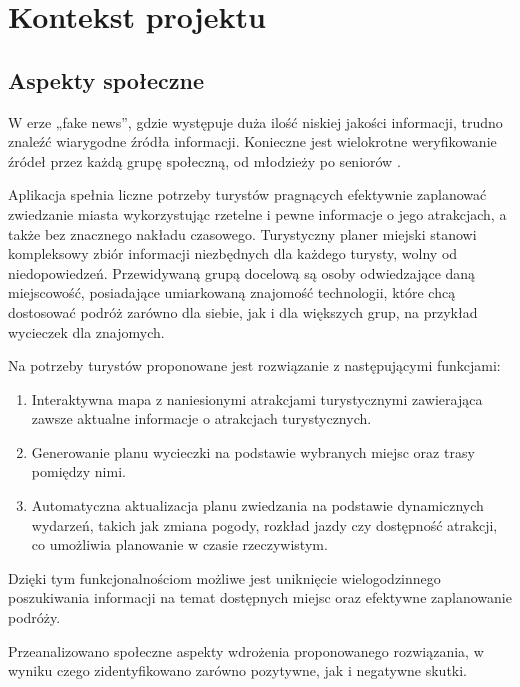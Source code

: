 
\chapter{Kontekst projektu}
\label{ch:kontekst-projektu}

\section{Aspekty społeczne}
\label{sec:aspekty-spoleczne}

W erze „fake news”, gdzie występuje duża ilość niskiej jakości informacji, trudno znaleźć wiarygodne źródła informacji.
Konieczne jest wielokrotne weryfikowanie źródeł przez każdą grupę społeczną, od młodzieży po seniorów \cite{fakenews}.

\indent Aplikacja spełnia liczne potrzeby turystów pragnących efektywnie zaplanować zwiedzanie miasta wykorzystując rzetelne i pewne informacje o jego atrakcjach, a także bez znacznego nakładu czasowego.
Turystyczny planer miejski stanowi kompleksowy zbiór informacji niezbędnych dla każdego turysty, wolny od niedopowiedzeń.
Przewidywaną grupą docelową są osoby odwiedzające daną miejscowość, posiadające umiarkowaną znajomość technologii, które chcą dostosować podróż zarówno dla siebie, jak i dla większych grup, na przykład wycieczek dla znajomych.

\indent Na potrzeby turystów proponowane jest rozwiązanie z następującymi funkcjami:

\begin{enumerate}
    \item Interaktywna mapa z naniesionymi atrakcjami turystycznymi zawierająca zawsze aktualne informacje o atrakcjach turystycznych.
    \item Generowanie planu wycieczki na podstawie wybranych miejsc oraz trasy pomiędzy nimi.
    \item Automatyczna aktualizacja planu zwiedzania na podstawie dynamicznych wydarzeń, takich jak zmiana pogody, rozkład jazdy czy dostępność atrakcji, co umożliwia planowanie w czasie rzeczywistym.
\end{enumerate}

Dzięki tym funkcjonalnościom możliwe jest uniknięcie wielogodzinnego poszukiwania informacji na temat dostępnych miejsc oraz efektywne zaplanowanie podróży.

\indent Przeanalizowano społeczne aspekty wdrożenia proponowanego rozwiązania, w wyniku czego zidentyfikowano zarówno pozytywne, jak i negatywne skutki.


